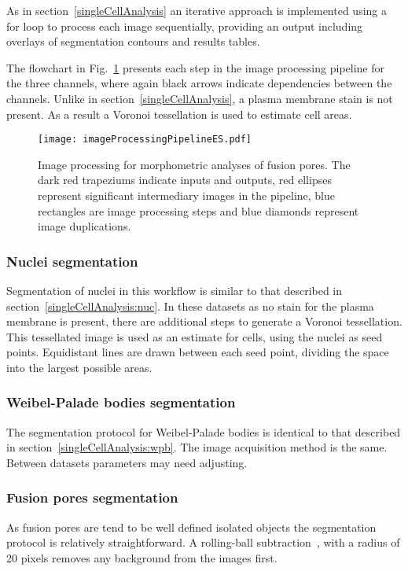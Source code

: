 As in section~\ref{singleCellAnalysis} an iterative approach is implemented using a for loop to process each image sequentially, providing an output including overlays of segmentation contours and results tables.

The flowchart in Fig.~\ref{imageProcessingPipeline:exitSites} presents each step in the image processing pipeline for the three channels, where again black arrows indicate dependencies between the channels. Unlike in section~\ref{singleCellAnalysis}, a plasma membrane stain is not present. As a result a Voronoi tessellation is used to estimate cell areas.

\begin{figure}[htbp]
	\centering
	\texttt{[image: imageProcessingPipelineES.pdf]}
	\caption[Image processing pipeline]{Image processing for morphometric analyses of fusion pores. The dark red trapeziums indicate inputs and outputs, red ellipses represent significant intermediary images in the pipeline, blue rectangles are image processing steps and blue diamonds represent image duplications.}
	\label{imageProcessingPipeline:exitSites}
\end{figure}

\subsubsection{Nuclei segmentation}
\label{exitSites:nuc}
Segmentation of nuclei in this workflow is similar to that described in section~\ref{singleCellAnalysis:nuc}. In these datasets as no stain for the plasma membrane is present, there are additional steps to generate a Voronoi tessellation. This tessellated image is used as an estimate for cells, using the nuclei as seed points. Equidistant lines are drawn between each seed point, dividing the space into the largest possible areas. 

\subsubsection{Weibel-Palade bodies segmentation}
The segmentation protocol for Weibel-Palade bodies is identical to that described in section~\ref{singleCellAnalysis:wpb}. The image acquisition method is the same. Between datasets parameters may need adjusting.

\subsubsection{Fusion pores segmentation}
As fusion pores are tend to be well defined isolated objects the segmentation protocol is relatively straightforward. A rolling-ball subtraction~\cite{ Sternberg1983}, with a radius of 20 pixels removes any background from the images first. 

